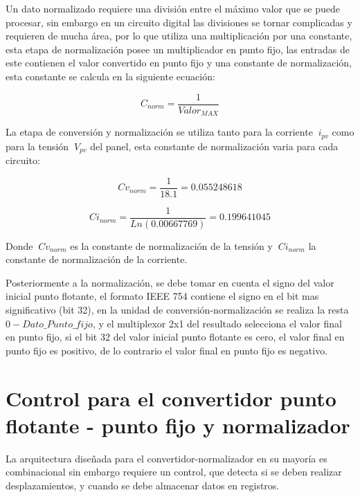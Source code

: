 Un dato normalizado requiere una división entre el máximo valor que se puede procesar, sin embargo en un circuito digital las divisiones se tornar complicadas y requieren de mucha área, por lo que utiliza una multiplicación por una constante, esta etapa de normalización  posee un multiplicador en punto fijo, las entradas de este contienen el valor convertido en punto fijo y una constante de normalización, esta constante se calcula en la siguiente ecuación: 
      

\begin{equation} \label{eq:ej1}
  C_{norm}
  = \frac{1}{Valor_{MAX}}  
\end{equation}  

La etapa de conversión y normalización se utiliza tanto para la corriente $\ i_{pv} $ como para la tensión $\ V_{pv} $ del panel, esta constante de normalización varia para cada circuito:
  
\begin{equation} \label{eq:ej2}
  Cv_{norm}
  = \frac{1}{18.1} = 0.055248618  
\end{equation}

\begin{equation} \label{eq:ej3}
  Ci_{norm}
  = \frac{1}{Ln\left(0.00667769\right)} = 0.199641045  
\end{equation}
 
 Donde $\ Cv_{norm}$ es la constante de normalización de la tensión y $\ Ci_{norm}$ la constante de normalización de la corriente. 
 
 Posteriormente a la normalización, se debe tomar en cuenta el signo del valor inicial punto flotante, el formato IEEE 754 contiene el signo en el bit mas significativo (bit 32), en la unidad de conversión-normalización se realiza la resta $0-Dato\_Punto\_fijo$, y el multiplexor 2x1 del resultado selecciona el valor final en punto fijo, si el bit 32 del valor inicial punto flotante es cero, el valor final en punto fijo es positivo, de lo contrario el valor final en punto fijo es negativo. 
  
\section{Control para el convertidor punto flotante - punto fijo y normalizador}

La arquitectura diseñada para el convertidor-normalizador en su mayoría es combinacional sin embargo requiere un control, que detecta si se deben realizar desplazamientos, y cuando se debe almacenar datos en registros. 

